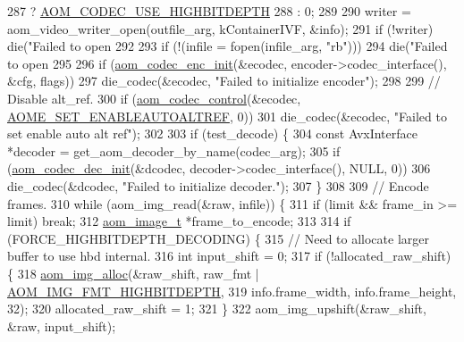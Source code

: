 \begin{DoxyCodeInclude}
{{{{{{{{287                ? \hyperlink{group__encoder_gae30bbbdef18e9da3631b69c170533e92}{AOM\_CODEC\_USE\_HIGHBITDEPTH}
288                : 0;
289 
290   writer = aom\_video\_writer\_open(outfile\_arg, kContainerIVF, &info);
291   \textcolor{keywordflow}{if} (!writer) die(\textcolor{stringliteral}{"Failed to open %
292 
293   \textcolor{keywordflow}{if} (!(infile = fopen(infile\_arg, \textcolor{stringliteral}{"rb"})))
294     die(\textcolor{stringliteral}{"Failed to open %
295 
296   \textcolor{keywordflow}{if} (\hyperlink{group__encoder_gaade68a7d33d30f97dc9a596aa5e065d8}{aom\_codec\_enc\_init}(&ecodec, encoder->codec\_interface(), &cfg, flags))
297     die\_codec(&ecodec, \textcolor{stringliteral}{"Failed to initialize encoder"});
298 
299   \textcolor{comment}{// Disable alt\_ref.}
300   \textcolor{keywordflow}{if} (\hyperlink{group__codec_ga6da974f4eeaba1fa74106b28d0fe6ac5}{aom\_codec\_control}(&ecodec, \hyperlink{group__aom__encoder_ggae78dde67a6d78f332e9bdba0dde42db5ac8a24393f214823f5a6bd345afb840b6}{AOME\_SET\_ENABLEAUTOALTREF}, 0))
301     die\_codec(&ecodec, \textcolor{stringliteral}{"Failed to set enable auto alt ref"});
302 
303   \textcolor{keywordflow}{if} (test\_decode) \{
304     \textcolor{keyword}{const} AvxInterface *decoder = get\_aom\_decoder\_by\_name(codec\_arg);
305     \textcolor{keywordflow}{if} (\hyperlink{group__decoder_gafdbfca65b19ab1f6d72b32cd01753b9b}{aom\_codec\_dec\_init}(&dcodec, decoder->codec\_interface(), NULL, 0))
306       die\_codec(&dcodec, \textcolor{stringliteral}{"Failed to initialize decoder."});
307   \}
308 
309   \textcolor{comment}{// Encode frames.}
310   \textcolor{keywordflow}{while} (aom\_img\_read(&raw, infile)) \{
311     \textcolor{keywordflow}{if} (limit && frame\_in >= limit) \textcolor{keywordflow}{break};
312     \hyperlink{structaom__image}{aom\_image\_t} *frame\_to\_encode;
313 
314     \textcolor{keywordflow}{if} (FORCE\_HIGHBITDEPTH\_DECODING) \{
315       \textcolor{comment}{// Need to allocate larger buffer to use hbd internal.}
316       \textcolor{keywordtype}{int} input\_shift = 0;
317       \textcolor{keywordflow}{if} (!allocated\_raw\_shift) \{
318         \hyperlink{aom__image_8h_a570db29fbd122951235a08fe9375f6bb}{aom\_img\_alloc}(&raw\_shift, raw\_fmt | 
      \hyperlink{aom__image_8h_a607b37d91f75442f54223ecd85f1b6cb}{AOM\_IMG\_FMT\_HIGHBITDEPTH},
319                       info.frame\_width, info.frame\_height, 32);
320         allocated\_raw\_shift = 1;
321       \}
322       aom\_img\_upshift(&raw\_shift, &raw, input\_shift);
}}}}}}}}}}
\end{DoxyCodeInclude}
